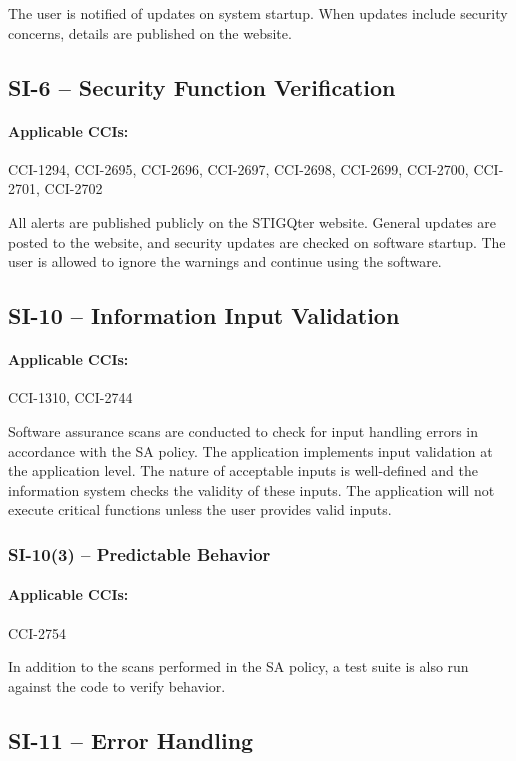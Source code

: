 \documentclass[letterpaper, 10pt, twoside]{article}
\begin{document}
The user is notified of updates on system startup. When updates include security concerns, details are published on the website.

\subsection{SI-6 -- Security Function Verification}

\paragraph{Applicable CCIs:} CCI-1294, CCI-2695, CCI-2696, CCI-2697, CCI-2698, CCI-2699, CCI-2700, CCI-2701, CCI-2702

All alerts are published publicly on the STIGQter website. General updates are posted to the website, and security updates are checked on software startup. The user is allowed to ignore the warnings and continue using the software.

\subsection{SI-10 -- Information Input Validation}

\paragraph{Applicable CCIs:} CCI-1310, CCI-2744

Software assurance scans are conducted to check for input handling errors in accordance with the SA policy. The application implements input validation at the application level. The nature of acceptable inputs is well-defined and the information system checks the validity of these inputs. The application will not execute critical functions unless the user provides valid inputs.

\subsubsection{SI-10(3) -- Predictable Behavior}

\paragraph{Applicable CCIs:} CCI-2754

In addition to the scans performed in the SA policy, a test suite is also run against the code to verify behavior.

\subsection{SI-11 -- Error Handling}
\end{document}
